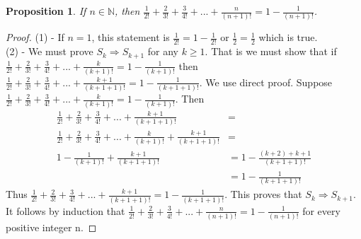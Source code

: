 \documentclass[12pt,letterpaper, onecolumn]{exam}
\newtheorem*{prop}{Proposition}
\begin{document}
\begin{questions}
			\begin{solution}
				\begin{prop}
					If $n\in\mathbb{N}$, then $\frac{1}{2!}+\frac{2}{3!}+\frac{3}{4!}+...+\frac{n}{(n+1)!}=1-\frac{1}{(n+1)!}$.
				\end{prop}
				\begin{proof}
					(1) - If $n=1$, this statement is $\frac{1}{2!}=1-\frac{1}{2!}$ or $\frac{1}{2}=\frac{1}{2}$ which is true.\\
					(2) - We must prove $S_k\Rightarrow S_{k+1}$ for any $k\geq1$. That is we must show that if $\frac{1}{2!}+\frac{2}{3!}+\frac{3}{4!}+...+\frac{k}{(k+1)!}=1-\frac{1}{(k+1)!}$ then $\frac{1}{2!}+\frac{2}{3!}+\frac{3}{4!}+...+\frac{k+1}{(k+1+1)!}=1-\frac{1}{(k+1+1)!}$. We use direct proof. Suppose $\frac{1}{2!}+\frac{2}{3!}+\frac{3}{4!}+...+\frac{k}{(k+1)!}=1-\frac{1}{(k+1)!}$. Then
					\begin{align*}
					\frac{1}{2!}+\frac{2}{3!}+\frac{3}{4!}+...+\frac{k+1}{(k+1+1)!}&=\\
					\frac{1}{2!}+\frac{2}{3!}+\frac{3}{4!}+...+\frac{k}{(k+1)!}+\frac{k+1}{(k+1+1)!}&=\\
					1-\frac{1}{(k+1)!}+\frac{k+1}{(k+1+1)!}&=1-\frac{(k+2)+k+1}{(k+1+1)!}\\
					&=1-\frac{1}{(k+1+1)!}
					\end{align*}
					Thus $\frac{1}{2!}+\frac{2}{3!}+\frac{3}{4!}+...+\frac{k+1}{(k+1+1)!}=1-\frac{1}{(k+1+1)!}$. This proves that $S_k\Rightarrow S_{k+1}$. It follows by induction that $\frac{1}{2!}+\frac{2}{3!}+\frac{3}{4!}+...+\frac{n}{(n+1)!}=1-\frac{1}{(n+1)!}$ for every positive integer n.
				\end{proof}
			\end{solution}
	\end{questions}
	
\end{document}
